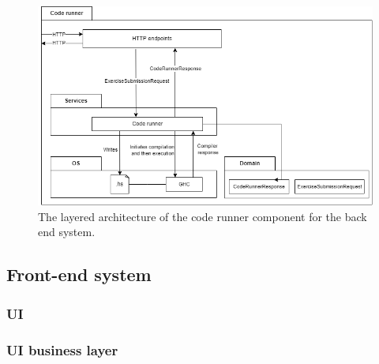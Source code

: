 \begin{figure}
    \centering
    \includegraphics[width=\textwidth,height=\textheight,keepaspectratio]{sections/Chapter 2/pics/P7 arch-Backend - HS compiler.drawio.png}
    \caption[]{The layered architecture of the code runner component for the back end system.}
    \label{fig:code_runner}
\end{figure}

\subsection{Front-end system}

\subsubsection{UI}

\subsubsection{UI business layer}
